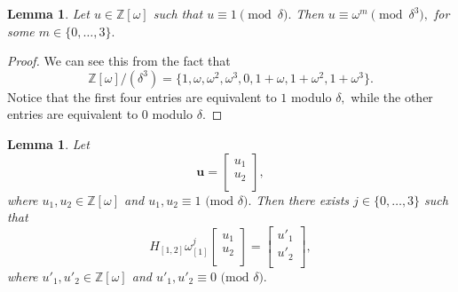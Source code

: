 \documentclass{dalthesis}
\theoremstyle{theorem}
\newtheorem{lemma}[theorem]{Lemma}
\theoremstyle{definition}
\theoremstyle{definition}  %
\theoremstyle{definition}
\newcommand{\Z}{\mathbb{Z}}
\renewcommand{\:}{\mathbin{:}}
\begin{document}
\begin{lemma}
\label{OmegaModLemma}
Let $u\in\Z[\omega]$ such that $u\equiv 1\pmod{\delta}.$ Then $u \equiv \omega^m\pmod{\delta^3},$ for some $m\in\{0,\ldots,3\}.$
\end{lemma}
\begin{proof}
We can see this from the fact that \[\Z[\omega]/(\delta^3) = \{1,\omega,\omega^2,\omega^3,0,1+\omega,1+\omega^2,1+\omega^3\}.\]
 Notice that the first four entries are equivalent to $1$ modulo $\delta,$ while the other entries are equivalent to $0$ modulo $\delta.$
\end{proof}
\begin{lemma}
\label{RowReductLemma}
Let 
\[\boldsymbol{u} = \left[\begin{array}{c}
u_1\\
u_2\\
\end{array}\right],\] where $u_1,u_2\in\Z[\omega]$ and  $u_1,u_2\equiv 1\mbox{ (mod }\delta).$ Then there exists $j\in\{0,\ldots,3\}$ such that \[H_{[1,2]}\omega_{[1]}^j\left[\begin{array}{c}
u_1\\
u_2\\
\end{array}\right] = \left[\begin{array}{c}
u'_1\\
u'_2\\
\end{array}\right],\] where $u'_1,u'_2\in\Z[\omega]$ and $u
'_1,u'_2\equiv 0\mbox{ (mod }\delta).$
\end{lemma}
\end{document}
